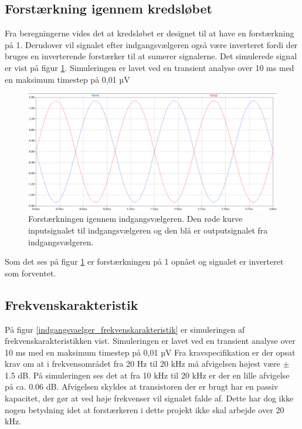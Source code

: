 \subsection*{Forstærkning igennem kredsløbet}
Fra beregningerne vides det at kredsløbet er designet til at have en forstærkning på 1. Derudover vil signalet efter indgangsvælgeren også være inverteret fordi der bruges en inverterende forstærker til at sumerer signalerne. Det simulerede signal er vist på figur \ref{indgangsvaelger_input/output}. Simuleringen er lavet ved en transient analyse over 10 ms med en maksimum timestep på 0,01 µV
\begin{figure}[h]
\centering
\includegraphics[scale=0.3]{teknisk/indgangsvaelger/simulering/input_output.png}
\caption{Forstærkningen igennem indgangsvælgeren. Den røde kurve inputsignalet til indgangsvælgeren og den blå er outputsignalet fra indgangsvælgeren.}
\label{indgangsvaelger_input/output}
\end{figure}

Som det ses på figur \ref{indgangsvaelger_input/output} er forstærkningen på 1 opnået og signalet er inverteret som forventet.


\subsection*{Frekvenskarakteristik}
På figur \ref{indgangsvaelger_frekvenskarakteristik} er simuleringen af frekvenskarakteristikken vist. Simuleringen er lavet ved en transient analyse over 10 ms med en maksimum timestep på 0,01 µV Fra kravspecifikation er der opsat krav om at i frekvensområdet fra 20 Hz til 20 kHz må afvigelsen højest være $\pm$ 1.5 dB. På simuleringen ses det at fra 10 kHz til 20 kHz er der en lille afvigelse på ca. 0.06 dB. Afvigelsen skyldes at transistoren der er brugt har en passiv kapacitet, der gør at ved høje frekvenser vil signalet falde af. Dette har dog ikke nogen betydning idet at forstærkeren i dette projekt ikke skal arbejde over 20 kHz.

